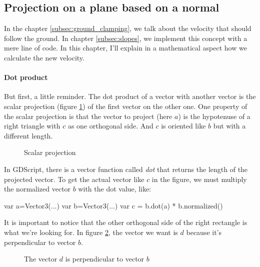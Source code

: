 \documentclass[10pt,a4paper]{article}
\begin{document}
\subsection{Projection on a plane based on a normal}
\label{subsec:ortho_projection}
In the chapter \ref{subsec:ground_clamping}, we talk about the velocity that should follow the ground. In chapter \ref{subsec:slopes}, we implement this concept with a mere line of code. In this chapter, I'll explain in a mathematical aspect how we calculate the new velocity.

\paragraph{Dot product}
But first, a little reminder. The dot product of a vector with another vector is the scalar projection (figure \ref{fig:scalar_projection}) of the first vector on the other one. One property of the scalar projection is that the vector to project (here $a$) is the hypotenuse of a right triangle with $c$ as one orthogonal side. And $c$ is oriented like $b$ but with a different length.
\begin{figure}[H]
\centering
{}
\caption{Scalar projection}
\label{fig:scalar_projection}
\end{figure}
In GDScript, there is a vector function called \textit{dot} that returns the length of the projected vector. To get the actual vector like $c$ in the figure, we must multiply the normalized vector $b$ with the dot value, like:
\begin{pythoncode}
  var a=Vector3(...)
  var b=Vector3(...)
  var c = b.dot(a) * b.normalized()
\end{pythoncode}

It is important to notice that the other orthogonal side of the right rectangle is what we're looking for. In figure \ref{fig:wanted_scalar_projection}, the vector we want is $d$ because it's perpendicular to vector $b$.
\begin{figure}[H]
\centering
{}
\caption{The vector $d$ is perpendicular to vector $b$}
\label{fig:wanted_scalar_projection}
\end{figure}
\end{document}

